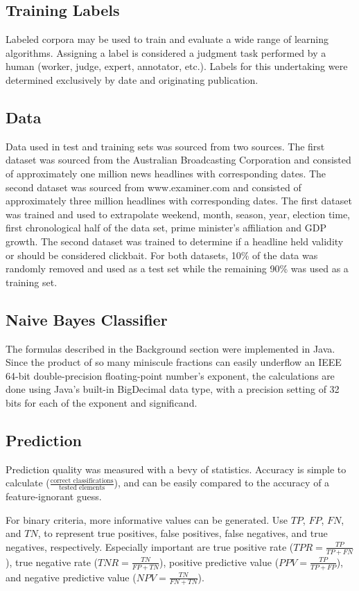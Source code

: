 \documentclass[format=acmlarge]{acmart}
\begin{document}
\subsection{Training Labels}
Labeled corpora may be used to train and evaluate a wide range of learning algorithms. Assigning a label is considered a judgment task performed by a human (worker, judge, expert, annotator, etc.).  Labels for this undertaking were determined exclusively by date and originating publication.
\subsection{Data}
Data used in test and training sets was sourced from two sources.  The first dataset was sourced from the Australian Broadcasting Corporation and consisted of approximately one million news headlines with corresponding dates.  The second dataset was sourced from www.examiner.com and consisted of approximately three million headlines with corresponding dates.  The first dataset was trained and used to extrapolate weekend, month, season, year, election time, first chronological half of the data set, prime minister's affiliation and GDP growth.  The second dataset was trained to determine if a headline held validity or should be considered clickbait. For both datasets, 10\% of the data was randomly removed and used as a test set while the remaining 90\% was used as a training set.
\subsection{Naive Bayes Classifier}
The formulas described in the Background section were implemented in Java.  Since the product of so many miniscule fractions can easily underflow an IEEE 64-bit double-precision floating-point number's exponent, the calculations are done using Java's built-in BigDecimal data type, with a precision setting of 32 bits for each of the exponent and significand.
\subsection{Prediction}
Prediction quality was measured with a bevy of statistics.  Accuracy is simple to calculate ($\frac{\textrm{correct classifications}}{\textrm{tested elements}}$), and can be easily compared to the accuracy of a feature-ignorant guess.

For binary criteria, more informative values can be generated.  Use $\mathit{TP}$, $\mathit{FP}$, $\mathit{FN}$, and $\mathit{TN}$, to represent true positives, false positives, false negatives, and true negatives, respectively.  Especially important are true positive rate ($\mathit{TPR} = \frac{\mathit{TP}}{\mathit{TP} + \mathit{FN}}$), true negative rate ($\mathit{TNR} = \frac{\mathit{TN}}{\mathit{FP} + \mathit{TN}}$), positive predictive value ($\mathit{PPV} = \frac{\mathit{TP}}{\mathit{TP} + \mathit{FP}}$), and negative predictive value ($\mathit{NPV} = \frac{\mathit{TN}}{\mathit{FN} + \mathit{TN}}$).
\end{document}
